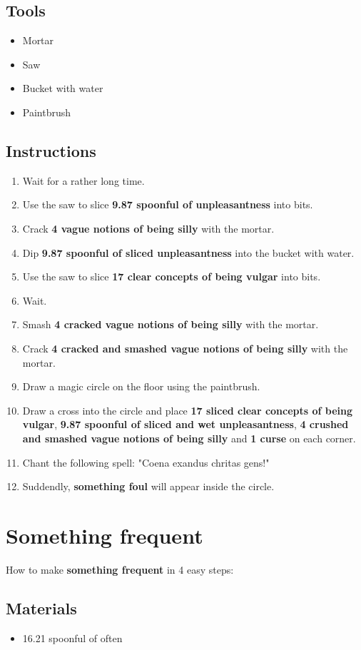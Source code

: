 \documentclass{article}
\begin{document}
\subsection{Tools}\begin{itemize}
\item 
Mortar
\item 
Saw
\item 
Bucket with water
\item 
Paintbrush
\end{itemize}
\subsection{Instructions}\begin{enumerate}
\item 
Wait for a rather long time.
\item 
Use the saw to slice \textbf{9.87 spoonful of unpleasantness} into bits.
\item 
Crack \textbf{4 vague notions of being silly} with the mortar.
\item 
Dip \textbf{9.87 spoonful of sliced unpleasantness} into the bucket with water.
\item 
Use the saw to slice \textbf{17 clear concepts of being vulgar} into bits.
\item 
Wait.
\item 
Smash \textbf{4 cracked vague notions of being silly} with the mortar.
\item 
Crack \textbf{4 cracked and smashed vague notions of being silly} with the mortar.
\item 
Draw a magic circle on the floor using the paintbrush.
\item 
Draw a cross into the circle and place \textbf{17 sliced clear concepts of being vulgar}, \textbf{9.87 spoonful of sliced and wet unpleasantness}, \textbf{4 crushed and smashed vague notions of being silly} and \textbf{1 curse} on each corner.
\item 
Chant the following spell: "Coena exandus chritas gens!"
\item 
Suddendly, \textbf{something foul} will appear inside the circle.
\end{enumerate}
\newpage
\section{Something frequent}How to make \textbf{something frequent} in 4 easy steps:

\subsection{Materials}\begin{itemize}
\item 
16.21 spoonful of often
\end{itemize}
\end{document}
